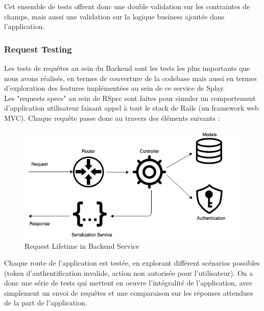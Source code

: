 \documentclass{eplmastersthesis}
\begin{document}
          Cet ensemble de tests offrent donc une double validation sur les contraintes
          de champs, mais aussi une validation sur la logique business ajoutée
          dans l'application.

        \subsubsection{Request Testing}

          Les tests de requêtes au sein du Backend sont les tests les plus
          importants que nous avons réalisés, en termes de couverture de la
          codebase mais aussi en termes d'exploration des features implémentées
          au sein de ce service de Splay.\\

          Les "requests specs" au sein de RSpec sont faites pour simuler un
          comportement d'application utilisateur faisant appel à tout le stack
          de Rails (un framework web MVC).
          Chaque requête passe donc au travers des éléments suivants :\\

          \begin{figure}[H]
            \centering
            \includegraphics[scale=0.6]{figures/request_test.png}
            \caption{\label{new_arch} Request Lifetime in Backend Service}
          \end{figure}

          Chaque route de l'application est testée, en explorant différent
          scénarios possibles (token d'authentification invalide, action
          non autorisée pour l'utilisateur). On a donc une série de tests
          qui mettent en oeuvre l'intégralité de l'application, avec simplement
          un envoi de requêtes et une comparaison sur les réponses attendues
          de la part de l'application.
\end{document}
